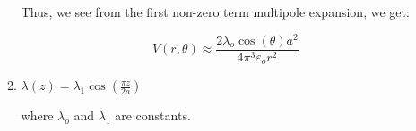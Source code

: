 \begin{enumerate}
\begin{enumerate}
        Thus, we see from the first non-zero term multipole expansion, we get:

        $$\boxed{V(r,\theta)\approx\frac{2\lambda_o\cos(\theta)a^2}{4\pi^3\varepsilon_o r^2}}$$

      \item $\lambda(z)=\lambda_1\cos\left( \frac{\pi z}{2a} \right)$

        where $\lambda_o$ and $\lambda_1$ are constants.

    \end{enumerate}

\end{enumerate}



